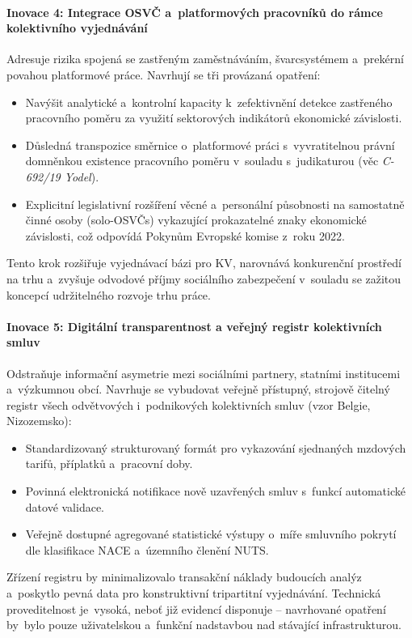 \paragraph{Inovace 4: Integrace \acs{OSVČ} a~platformových pracovníků do rámce kolektivního vyjednávání}\label{par:inovace_svarc}
Adresuje rizika spojená se zastřeným zaměstnáváním, švarcsystémem a~prekérní povahou platformové práce. Navrhují se tři provázaná opatření:
\begin{itemize}[noitemsep]
  \item Navýšit analytické a~kontrolní kapacity  k~zefektivnění detekce zastřeného pracovního poměru za využití sektorových indikátorů ekonomické závislosti.
  \item Důsledná transpozice směrnice o~platformové práci s~vyvratitelnou právní domněnkou existence pracovního poměru v~souladu s~judikaturou  (věc \emph{C-692/19 Yodel}).
  \item Explicitní legislativní rozšíření věcné a~personální působnosti  na samostatně činné osoby (solo-\acp{OSVČ}) vykazující prokazatelné znaky ekonomické závislosti, což odpovídá Pokynům Evropské komise z~roku \SI{2022}{\rok}.\par
\end{itemize}
Tento krok rozšiřuje vyjednávací bázi pro \ac{KV}, narovnává konkurenční prostředí na trhu a~zvyšuje odvodové příjmy sociálního zabezpečení v~souladu se zažitou koncepcí udržitelného rozvoje trhu práce.\par

\paragraph{Inovace 5: Digitální transparentnost a veřejný registr kolektivních smluv}\label{par:inovace_registr}
Odstraňuje informační asymetrie mezi sociálními partnery, statními institucemi a~výzkumnou obcí. Navrhuje se vybudovat veřejně přístupný, strojově čitelný registr všech odvětvových i~podnikových kolektivních smluv (vzor Belgie, Nizozemsko):
\begin{itemize}[noitemsep]
  \item Standardizovaný strukturovaný formát pro vykazování sjednaných mzdových tarifů, příplatků a~pracovní doby.
  \item Povinná elektronická notifikace nově uzavřených smluv s~funkcí automatické datové validace.
  \item Veřejně dostupné agregované statistické výstupy o~míře smluvního pokrytí dle klasifikace \acs{NACE} a~územního členění \acs{NUTS}.
\end{itemize}
Zřízení registru by minimalizovalo transakční náklady budoucích analýz a~poskytlo pevná data pro konstruktivní tripartitní vyjednávání. Technická proveditelnost je~vysoká, neboť  již evidencí disponuje -- navrhované opatření by~bylo pouze uživatelskou a~funkční nadstavbou nad stávající infrastrukturou.\par

